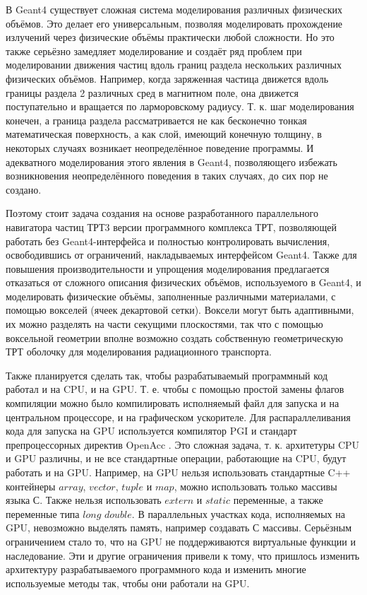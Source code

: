 \documentclass[a4paper,12pt]{article}
\begin{document}
\begin{large}
    В Geant4 существует сложная система моделирования различных физических объёмов.
    Это делает его универсальным, позволяя моделировать прохождение излучений через физические объёмы практически любой сложности.
    Но это также серьёзно замедляет моделирование и создаёт ряд проблем при моделировании движения частиц вдоль границ раздела нескольких различных физических объёмов.
    Например, когда заряженная частица движется вдоль границы раздела 2 различных сред в магнитном поле, она движется поступательно и вращается по ларморовскому радиусу.
    Т. к. шаг моделирования конечен, а граница раздела рассматривается не как бесконечно тонкая математическая поверхность, а как слой, имеющий конечную толщину, в некоторых случаях возникает неопределённое поведение программы.
    И адекватного моделирования этого явления в Geant4, позволяющего избежать возникновения неопределённого поведения в таких случаях, до сих пор не создано.
    
    Поэтому стоит задача создания на основе разработанного параллельного навигатора частиц ТРТ3 версии программного комплекса ТРТ, позволяющей работать без Geant4-интерфейса и полностью контролировать вычисления, освободившись от ограничений, накладываемых интерфейсом Geant4.
    Также для повышения производительности и упрощения моделирования предлагается отказаться от сложного описания физических объёмов, используемого в Geant4, и моделировать физические объёмы, заполненные различными материалами, с помощью вокселей (ячеек декартовой сетки).
    Воксели могут быть адаптивными, их можно разделять на части секущими плоскостями, так что с помощью воксельной геометрии вполне возможно создать собственную геометрическую ТРТ оболочку для моделирования радиационного транспорта.
    
    Также планируется сделать так, чтобы разрабатываемый программный код работал и на CPU, и на GPU.
    Т. е. чтобы с помощью простой замены флагов компиляции можно было компилировать исполняемый файл для запуска и на центральном процессоре, и на графическом ускорителе.
    Для распараллеливания кода для запуска на GPU используется компилятор PGI \cite{PGI} и стандарт препроцессорных директив OpenAcc \cite{OpenAcc}.
    Это сложная задача, т. к. архитетуры CPU и GPU различны, и не все стандартные операции, работающие на CPU, будут работать и на GPU.
    Например, на GPU нельзя использовать стандартные C++ контейнеры $array$, $vector$, $tuple$ и $map$, можно использовать только массивы языка С.
    Также нельзя использовать $extern$ и $static$ переменные, а также переменные типа $long$ $double$.
    В параллельных участках кода, исполняемых на GPU, невозможно выделять память, например создавать С массивы.
    Серьёзным ограничением стало то, что на GPU не поддерживаются виртуальные функции и наследование. 		Эти и другие ограничения привели к тому, что пришлось изменить архитектуру разрабатываемого программного кода и изменить многие используемые методы так, чтобы они работали на GPU.
    

\end{large}
\end{document}
